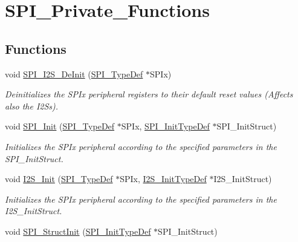\hypertarget{group___s_p_i___private___functions}{}\section{S\+P\+I\+\_\+\+Private\+\_\+\+Functions}
\label{group___s_p_i___private___functions}
\subsection*{Functions}
\begin{DoxyCompactItemize}
\item 
void \mbox{\hyperlink{group___s_p_i___private___functions_gabe36880945fa56785283a9c0092124cc}{S\+P\+I\+\_\+\+I2\+S\+\_\+\+De\+Init}} (\mbox{\hyperlink{struct_s_p_i___type_def}{S\+P\+I\+\_\+\+Type\+Def}} $\ast$S\+P\+Ix)
\begin{DoxyCompactList}\small\item\em Deinitializes the S\+P\+Ix peripheral registers to their default reset values (Affects also the I2\+Ss). \end{DoxyCompactList}\item 
void \mbox{\hyperlink{group___s_p_i___private___functions_ga8dacc1dc48bf08c0f12da409f4889037}{S\+P\+I\+\_\+\+Init}} (\mbox{\hyperlink{struct_s_p_i___type_def}{S\+P\+I\+\_\+\+Type\+Def}} $\ast$S\+P\+Ix, \mbox{\hyperlink{struct_s_p_i___init_type_def}{S\+P\+I\+\_\+\+Init\+Type\+Def}} $\ast$S\+P\+I\+\_\+\+Init\+Struct)
\begin{DoxyCompactList}\small\item\em Initializes the S\+P\+Ix peripheral according to the specified parameters in the S\+P\+I\+\_\+\+Init\+Struct. \end{DoxyCompactList}\item 
void \mbox{\hyperlink{group___s_p_i___private___functions_ga53661884ae4a9640df7cbc59187782f7}{I2\+S\+\_\+\+Init}} (\mbox{\hyperlink{struct_s_p_i___type_def}{S\+P\+I\+\_\+\+Type\+Def}} $\ast$S\+P\+Ix, \mbox{\hyperlink{struct_i2_s___init_type_def}{I2\+S\+\_\+\+Init\+Type\+Def}} $\ast$I2\+S\+\_\+\+Init\+Struct)
\begin{DoxyCompactList}\small\item\em Initializes the S\+P\+Ix peripheral according to the specified parameters in the I2\+S\+\_\+\+Init\+Struct. \end{DoxyCompactList}\item 
void \mbox{\hyperlink{group___s_p_i___private___functions_ga9a0116f88cc2c4478c270f05608703f1}{S\+P\+I\+\_\+\+Struct\+Init}} (\mbox{\hyperlink{struct_s_p_i___init_type_def}{S\+P\+I\+\_\+\+Init\+Type\+Def}} $\ast$S\+P\+I\+\_\+\+Init\+Struct)

\end{DoxyCompactItemize}

